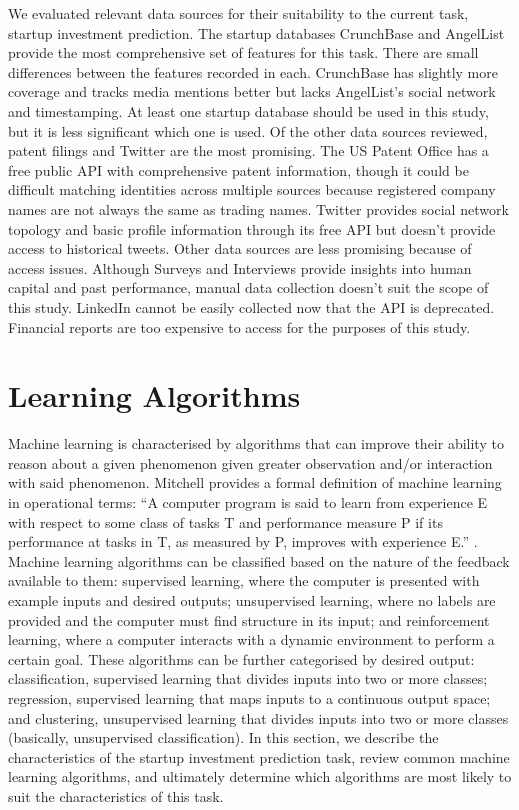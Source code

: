 \documentclass[../thesis/thesis.tex]{subfiles}
\begin{document}
We evaluated relevant data sources for their suitability to the current task, startup investment prediction. The startup databases CrunchBase and AngelList provide the most comprehensive set of features for this task. There are small differences between the features recorded in each. CrunchBase has slightly more coverage and tracks media mentions better but lacks AngelList's social network and timestamping. At least one startup database should be used in this study, but it is less significant which one is used. Of the other data sources reviewed, patent filings and Twitter are the most promising. The US Patent Office has a free public API with comprehensive patent information, though it could be difficult matching identities across multiple sources because registered company names are not always the same as trading names. Twitter provides social network topology and basic profile information through its free API but doesn't provide access to historical tweets. Other data sources are less promising because of access issues. Although Surveys and Interviews provide insights into human capital and past performance, manual data collection doesn't suit the scope of this study. LinkedIn cannot be easily collected now that the API is deprecated. Financial reports are too expensive to access for the purposes of this study.

\section{Learning Algorithms}
\label{sec:litreview:algorithms}

Machine learning is characterised by algorithms that can improve their ability to reason about a given phenomenon given greater observation and/or interaction with said phenomenon. Mitchell provides a formal definition of machine learning in operational terms: ``A computer program is said to learn from experience E with respect to some class of tasks T and performance measure P if its performance at tasks in T, as measured by P, improves with experience E.'' \cite{mitchell1997}. Machine learning algorithms can be classified based on the nature of the feedback available to them: supervised learning, where the computer is presented with example inputs and desired outputs; unsupervised learning, where no labels are provided and the computer must find structure in its input; and reinforcement learning, where a computer interacts with a dynamic environment to perform a certain goal. These algorithms can be further categorised by desired output: classification, supervised learning that divides inputs into two or more classes; regression, supervised learning that maps inputs to a continuous output space; and clustering, unsupervised learning that divides inputs into two or more classes (basically, unsupervised classification). In this section, we describe the characteristics of the startup investment prediction task, review common machine learning algorithms, and ultimately determine which algorithms are most likely to suit the characteristics of this task.
\end{document}
